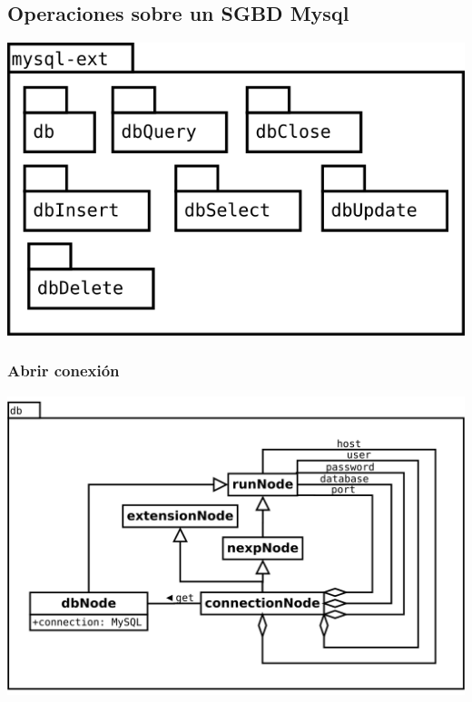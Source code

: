 \subsection {Operaciones sobre un SGBD Mysql}
\begin{center}
\includegraphics[scale=0.4]{mysql-ext-package.png} \\
\end{center}
\subsubsection {Abrir conexión}
\begin{center}
\includegraphics[scale=0.4]{db.png} \\
\end{center}

